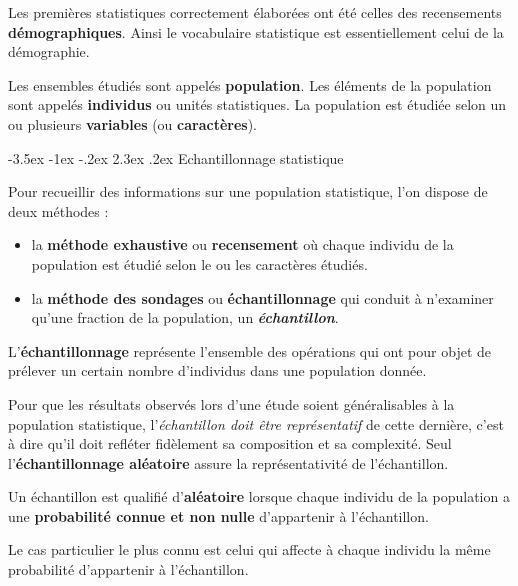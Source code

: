 \documentclass[]{book}
\makeatletter
\providecommand{\tightlist}{%
  \setlength{\itemsep}{0pt}\setlength{\parskip}{0pt}}
\renewcommand\section{\@startsection {section}{1}{\z@}%
                                   {-3.5ex \@plus -1ex \@minus -.2ex}%
                                   {2.3ex \@plus.2ex}%
                                   {\normalfont\Large\bfseries\color{ForestGreen}}}
\theoremstyle{magentacolor}
\theoremstyle{proprie}
\theoremstyle{exstyle}
\theoremstyle{exostyle}
\theoremstyle{definition}
\theoremstyle{definition}
\theoremstyle{definition}
\theoremstyle{remark}
\let\BeginKnitrBlock\begin \let\EndKnitrBlock\end
\makeatother
\begin{document}
Les premières statistiques correctement élaborées ont été celles des recensements
\textbf{démographiques}. Ainsi le vocabulaire statistique est essentiellement celui de la démographie.

Les ensembles étudiés sont appelés \textbf{population}. Les éléments de la population sont appelés
\textbf{individus} ou unités statistiques. La population est étudiée selon un ou plusieurs \textbf{variables} (ou \textbf{caractères}).

\hypertarget{echantillonnage-statistique}{%
\section{Echantillonnage statistique}\label{echantillonnage-statistique}}

Pour recueillir des informations sur une population statistique, l'on dispose de deux méthodes :

\begin{itemize}
\tightlist
\item
  la \textbf{méthode exhaustive} ou \textbf{recensement} où chaque individu de la population est étudié selon le ou les caractères étudiés.
\item
  la \textbf{méthode des sondages} ou \textbf{échantillonnage} qui conduit à n'examiner qu'une fraction de la population, un \textbf{\emph{échantillon}}.
\end{itemize}

\BeginKnitrBlock{definition}
\protect\hypertarget{def:unnamed-chunk-96}{}{\label{def:unnamed-chunk-96} }L'\textbf{échantillonnage} représente l'ensemble des opérations qui ont pour objet de prélever
un certain nombre d'individus dans une population donnée.
\EndKnitrBlock{definition}

Pour que les résultats observés lors d'une étude soient généralisables à la population
statistique, l'\emph{échantillon doit être représentatif} de cette dernière, c'est à dire qu'il doit
refléter fidèlement sa composition et sa complexité. Seul l'\textbf{échantillonnage aléatoire} assure la représentativité de l'échantillon.

\BeginKnitrBlock{rmdtip}
Un échantillon est qualifié d'\textbf{aléatoire} lorsque chaque individu de la population a
une \textbf{probabilité connue et non nulle} d'appartenir à l'échantillon.

Le cas particulier le plus connu est celui qui affecte à chaque individu la même probabilité
d'appartenir à l'échantillon.
\EndKnitrBlock{rmdtip}
\end{document}
